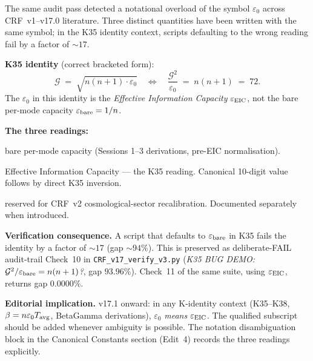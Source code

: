 \documentclass[12pt, a4paper]{article}
\begin{document}
The same audit pass detected a notational overload of the symbol
$\varepsilon_0$ across CRF~v1--v17.0 literature. Three distinct
quantities have been written with the same symbol; in the K35
identity context, scripts defaulting to the wrong reading fail by
a factor of $\sim 17$.

\begin{formalbox}[title={FIND-AM02: $\varepsilon_0$ Notational Overload}]
\textbf{K35 identity} (correct bracketed form):
\[
  \mathcal{G} \;=\; \sqrt{n(n+1)\cdot\varepsilon_0}
  \quad\Longleftrightarrow\quad
  \frac{\mathcal{G}^2}{\varepsilon_0} \;=\; n(n+1) \;=\; 72.
\]
The $\varepsilon_0$ in this identity is the \emph{Effective
Information Capacity} $\varepsilon_{\rm EIC}$, not the bare per-mode
capacity $\varepsilon_{\rm bare} = 1/n$.

\textbf{The three readings:}
\begin{description}[leftmargin=1.2cm,style=nextline]
  \item[$\varepsilon_{\rm bare} = 1/n = 0.125$]
        bare per-mode capacity (Sessions 1--3 derivations,
        pre-EIC normalisation).
  \item[$\varepsilon_{\rm EIC} = \mathcal{G}^2/(n(n+1)) = 0.0075516147$]
        Effective Information Capacity --- the K35 reading. Canonical
        10-digit value follows by direct K35 inversion.
  \item[$\varepsilon_0$ (third reading)]
        reserved for CRF~v2 cosmological-sector recalibration.
        Documented separately when introduced.
\end{description}

\textbf{Verification consequence.} A script that defaults to
$\varepsilon_{\rm bare}$ in K35 fails the identity by a factor of
$\sim 17$ (gap $\sim 94\%$). This is preserved as deliberate-FAIL
audit-trail Check~10 in \texttt{CRF\_v17\_verify\_v3.py}
(\textit{K35 BUG DEMO: $\mathcal{G}^2/\varepsilon_{\rm bare} = n(n+1)$?},
gap $93.96\%$). Check~11 of the same suite, using
$\varepsilon_{\rm EIC}$, returns gap $0.0000\%$.

\textbf{Editorial implication.} v17.1 onward: in any K-identity
context (K35--K38, $\beta = n\varepsilon_0 T_{\rm avg}$, BetaGamma
derivations), $\varepsilon_0$ \emph{means} $\varepsilon_{\rm EIC}$.
The qualified subscript should be added whenever ambiguity is
possible. The notation disambiguation block in the Canonical
Constants section (Edit~4) records the three readings explicitly.
\end{formalbox}
\end{document}
